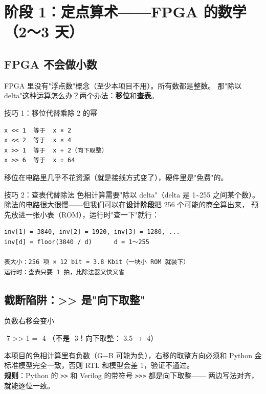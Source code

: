 \documentclass[11pt]{ctexart}
\newcommand{\code}[1]{\texttt{#1}}
\begin{document}
\section{阶段 1：定点算术——FPGA 的数学（2～3 天）}

\subsection{FPGA 不会做小数}

FPGA 里没有"浮点数"概念（至少本项目不用）。所有数都是整数。
那"除以 delta"这种运算怎么办？两个办法：\textbf{移位}和\textbf{查表}。

\begin{keybox}{技巧 1：移位代替乘除 2 的幂}
\begin{Verbatim}[fontsize=\small]
x << 1  等于  x × 2
x << 2  等于  x × 4
x >> 1  等于  x ÷ 2（向下取整）
x >> 6  等于  x ÷ 64
\end{Verbatim}
移位在电路里几乎不花资源（就是接线方式变了），硬件里是"免费"的。
\end{keybox}

\begin{keybox}{技巧 2：查表代替除法}
色相计算需要"除以 delta"（delta 是 1\textasciitilde 255 之间某个数）。
除法的电路很大很慢——但我们可以在\textbf{设计阶段}把 256 个可能的商全算出来，
预先放进一张小表（ROM），运行时"查一下"就行：

\begin{Verbatim}[fontsize=\small]
inv[1] = 3840, inv[2] = 1920, inv[3] = 1280, ...
inv[d] = floor(3840 / d)      d = 1～255

表大小：256 项 × 12 bit ≈ 3.8 Kbit（一块小 ROM 就装下）
运行时：查表只要 1 拍，比除法器又快又省
\end{Verbatim}
\end{keybox}

\subsection{截断陷阱：>> 是"向下取整"}

\begin{warnbox}{负数右移会变小}
\begin{Verilog}
-7 >> 1  =  -4     （不是 -3！向下取整：-3.5 → -4）
\end{Verilog}
本项目的色相计算里有负数（G−B 可能为负），右移的取整方向必须和
Python 金标准模型完全一致，否则 RTL 和模型会差 1，验证不通过。\\[4pt]
\textbf{规则}：Python 的 \code{>>} 和 Verilog 的带符号 \code{>>>} 都是向下取整——
两边写法对齐，就能逐位一致。
\end{warnbox}
\end{document}
